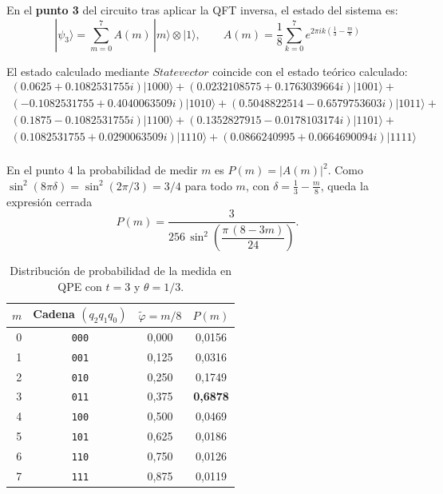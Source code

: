 En el \textbf{punto 3} del circuito tras aplicar la QFT inversa, el estado del sistema es:
\begin{equation}
    |\psi_3\rangle=\sum_{m=0}^{7}A(m)\,|m\rangle\otimes|1\rangle,\qquad A(m)=\frac18\sum_{k=0}^{7}e^{2\pi i k\left(\frac13-\frac m8\right)}
\end{equation}

El estado calculado mediante $Statevector$ coincide con el estado teórico calculado: 
\begin{align*}
    (0.0625 + 0.1082531755 i) |1000\rangle+(0.0232108575 + 0.1763039664 i) |1001\rangle+\\
    (-0.1082531755 + 0.4040063509 i) |1010\rangle+(0.5048822514 - 0.6579753603 i) |1011\rangle+\\
    (0.1875 - 0.1082531755 i) |1100\rangle+(0.1352827915 - 0.0178103174 i) |1101\rangle+\\
    (0.1082531755 + 0.0290063509 i) |1110\rangle+(0.0866240995 + 0.0664690094 i) |1111\rangle\\
\end{align*}

En el punto 4 la probabilidad de medir $m$ es $P(m) = |A(m)|^2$. Como
$\sin^2(8\pi\delta) = \sin^2(2\pi/3) = 3/4$ para todo $m$, con $\delta = \tfrac13 - \tfrac m8$,
queda la expresión cerrada
\begin{equation*}
  P(m) = \frac{3}{256\,\sin^2\!\left(\dfrac{\pi\,(8-3m)}{24}\right)} .
\end{equation*}

\begin{table}[h]
  \centering
  \begin{tabular}{@{}rccc@{}}
    \toprule
    $m$ & Cadena $(q_2 q_1 q_0)$ & $\tilde\varphi = m/8$ & $P(m)$ \\
    \midrule
    0 & \texttt{000} & 0,000 & 0,0156 \\
    1 & \texttt{001} & 0,125 & 0,0316 \\
    2 & \texttt{010} & 0,250 & 0,1749 \\
    3 & \texttt{011} & 0,375 & \textbf{0,6878} \\
    4 & \texttt{100} & 0,500 & 0,0469 \\
    5 & \texttt{101} & 0,625 & 0,0186 \\
    6 & \texttt{110} & 0,750 & 0,0126 \\
    7 & \texttt{111} & 0,875 & 0,0119 \\
    \bottomrule
  \end{tabular}
  \caption{Distribución de probabilidad de la medida en QPE con $t=3$ y $\theta = 1/3$.}
  \label{tab:e2_1_distribucion}
\end{table}

